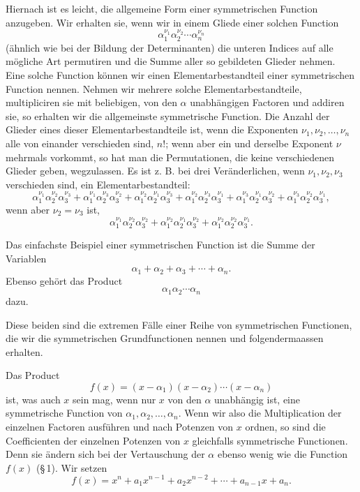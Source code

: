 \documentclass[11pt]{article}
\begin{document}
Hiernach ist es leicht, die allgemeine Form einer symmetrischen Function anzugeben. Wir erhalten sie, wenn wir in einem Gliede einer solchen Function
\[
 \alpha_1^{\nu_1}\alpha_2^{\nu_2}\cdots\alpha_n^{\nu_n}
\]
(ähnlich wie bei der Bildung der Determinanten) die unteren Indices auf alle mögliche Art permutiren und die Summe aller so gebildeten Glieder nehmen. Eine solche Function können wir einen Elementarbestandteil einer symmetrischen Function nennen. Nehmen wir mehrere solche Elementarbestandteile, multipliciren sie mit beliebigen, von den $\alpha$ unabhängigen Factoren und addiren sie, so erhalten wir die allgemeinste symmetrische Function. Die Anzahl der Glieder eines dieser Elementarbestandteile ist, wenn die Exponenten $\nu_1,\nu_2,\ldots,\nu_n$ alle von einander verschieden sind, $n!$; wenn aber ein und derselbe Exponent $\nu$ mehrmals vorkommt, so hat man die Permutationen, die keine verschiedenen Glieder geben, wegzulassen. Es ist z. B. bei drei Veränderlichen, wenn $\nu_1,\nu_2,\nu_3$ verschieden sind, ein Elementarbestandteil:
\[
 \alpha_1^{\nu_1}\alpha_2^{\nu_2}\alpha_3^{\nu_3}
+\alpha_1^{\nu_1}\alpha_2^{\nu_3}\alpha_3^{\nu_2}
+\alpha_1^{\nu_2}\alpha_2^{\nu_1}\alpha_3^{\nu_3}
+\alpha_1^{\nu_2}\alpha_2^{\nu_3}\alpha_3^{\nu_1}
+\alpha_1^{\nu_3}\alpha_2^{\nu_1}\alpha_3^{\nu_2}
+\alpha_1^{\nu_3}\alpha_2^{\nu_2}\alpha_3^{\nu_1},
\]
wenn aber $\nu_2=\nu_3$ ist,
\[
 \alpha_1^{\nu_1}\alpha_2^{\nu_2}\alpha_3^{\nu_2}
+\alpha_1^{\nu_2}\alpha_2^{\nu_1}\alpha_3^{\nu_2}
+\alpha_1^{\nu_2}\alpha_2^{\nu_2}\alpha_3^{\nu_1}.
\]

Das einfachste Beispiel einer symmetrischen Function ist die Summe der Variablen
\[
 \alpha_1+\alpha_2+\alpha_3+\cdots+\alpha_n.
\]
Ebenso gehört das Product
\[
 \alpha_1\alpha_2\cdots\alpha_n
\]
dazu.

Diese beiden sind die extremen Fälle einer Reihe von symmetrischen Functionen, die wir die symmetrischen Grundfunctionen nennen und folgendermaassen erhalten.

Das Product
\begin{equation}
 f(x)=(x-\alpha_1)(x-\alpha_2)\cdots(x-\alpha_n)
\tag{1}
\end{equation}
ist, was auch $x$ sein mag, wenn nur $x$ von den $\alpha$ unabhängig ist, eine symmetrische Function von $\alpha_1,\alpha_2,\ldots,\alpha_n$. Wenn wir also die Multiplication der einzelnen Factoren ausführen und nach Potenzen von $x$ ordnen, so sind die Coefficienten der einzelnen Potenzen von $x$ gleichfalls symmetrische Functionen. Denn sie ändern sich bei der Vertauschung der $\alpha$ ebenso wenig wie die Function $f(x)$ (\S\,1). Wir setzen
\begin{equation}
 f(x)=x^n+a_1x^{n-1}+a_2x^{n-2}+\cdots+a_{n-1}x+a_n.
\tag{2}
\end{equation}
\end{document}
